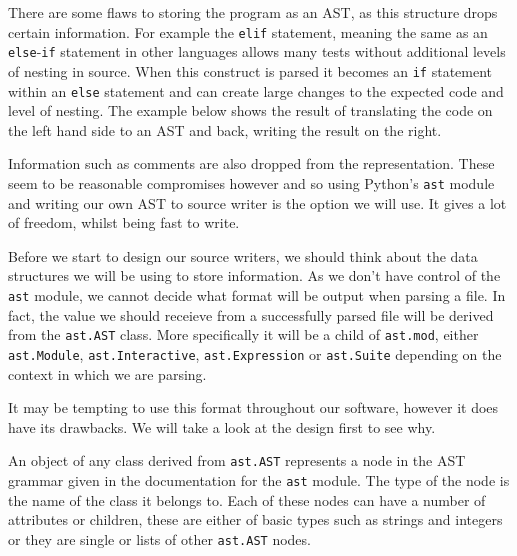 \documentclass[twoside,a4paper]{report}
\begin{document}
There are some flaws to storing the program as an AST, as this structure drops certain information.
For example the \texttt{elif} statement, meaning the same as an \texttt{else}-\texttt{if} statement in other languages allows many tests without
additional levels of nesting in source. When this construct is parsed it becomes an \texttt{if} statement within an \texttt{else} statement and
can create large changes to the expected code and level of nesting. The example below shows the result of translating the code on the left hand
side to an AST and back, writing the result on the right.

\begin{minipage}[b]{0.4\linewidth}
\centering

\end{minipage}
\hspace{1cm}
\begin{minipage}[b]{0.5\linewidth}
\centering

\end{minipage}

Information such as comments are also dropped from the representation. These seem to be reasonable compromises however and so
using Python's \texttt{ast} module and writing our own AST to source writer is the option we will use. It gives a lot of freedom, whilst
being fast to write.

Before we start to design our source writers, we should think about the data structures we will be using to store information. As we don't have
control of the \texttt{ast} module, we cannot decide what format will be output when parsing a file. In fact, the value we should receieve from
a successfully parsed file will be derived from the \texttt{ast.AST} class. More specifically it will be a child of \texttt{ast.mod}, either
\texttt{ast.Module}, \texttt{ast.Interactive}, \texttt{ast.Expression} or \texttt{ast.Suite} depending on the context in which we are parsing.

It may be tempting to use this format throughout our software, however it does have its drawbacks. We will take a look at the design first to see why.

An object of any class derived from \texttt{ast.AST} represents a node in the AST grammar given in the documentation for the \texttt{ast} module. The
type of the node is the name of the class it belongs to. Each of these nodes can have a number of attributes or children, these are either of basic
types such as strings and integers or they are single or lists of other \texttt{ast.AST} nodes.
\end{document}
